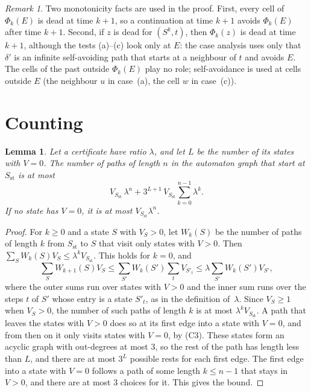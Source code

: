 \documentclass[11pt]{amsart}
\newtheorem{lemma}[theorem]{Lemma}
\theoremstyle{definition}
\theoremstyle{remark}
\newtheorem{remark}[theorem]{Remark}
\numberwithin{equation}{section}
\begin{document}
\begin{remark}\label{rem:mono}
Two monotonicity facts are used in the proof. First, every cell of $\Phi_k(E)$ is dead at time $k+1$, so a continuation at time $k+1$ avoids $\Phi_k(E)$ after time $k+1$. Second, if $z$ is dead for $(S^k,t)$, then $\Phi_k(z)$ is dead at time $k+1$, although the tests (a)--(c) look only at $E$: the case analysis uses only that $\delta'$ is an infinite self-avoiding path that starts at a neighbour of $t$ and avoids $E$. The cells of the past outside $\Phi_k(E)$ play no role; self-avoidance is used at cells outside $E$ (the neighbour $u$ in case~(a), the cell $w$ in case~(c)).
\end{remark}

\section{Counting}\label{sec:count}

\begin{lemma}\label{lem:count}
Let a certificate have ratio $\lambda$, and let $L$ be the number of its states with $V=0$. The number of paths of length $n$ in the automaton graph that start at $S_\mathrm{st}$ is at most
\[
V_{S_\mathrm{st}}\,\lambda^n+3^{L+1}\,V_{S_\mathrm{st}}\sum_{k=0}^{n-1}\lambda^k.
\]
If no state has $V=0$, it is at most $V_{S_\mathrm{st}}\lambda^n$.
\end{lemma}

\begin{proof}
For $k\ge0$ and a state $S$ with $V_S>0$, let $W_k(S)$ be the number of paths of length $k$ from $S_\mathrm{st}$ to $S$ that visit only states with $V>0$. Then $\sum_SW_k(S)V_S\le\lambda^kV_{S_\mathrm{st}}$. This holds for $k=0$, and
\[
\sum_SW_{k+1}(S)V_S\le\sum_{S'}W_k(S')\sum_{t}V_{S'_t}\le\lambda\sum_{S'}W_k(S')V_{S'},
\]
where the outer sums run over states with $V>0$ and the inner sum runs over the steps $t$ of $S'$ whose entry is a state $S'_t$, as in the definition of~$\lambda$. Since $V_S\ge1$ when $V_S>0$, the number of such paths of length $k$ is at most $\lambda^kV_{S_\mathrm{st}}$. A path that leaves the states with $V>0$ does so at its first edge into a state with $V=0$, and from then on it only visits states with $V=0$, by (C3). These states form an acyclic graph with out-degrees at most $3$, so the rest of the path has length less than $L$, and there are at most $3^L$ possible rests for each first edge. The first edge into a state with $V=0$ follows a path of some length $k\le n-1$ that stays in $V>0$, and there are at most $3$ choices for it. This gives the bound.
\end{proof}
\end{document}
